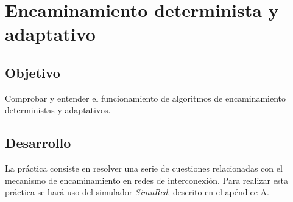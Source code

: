 \section{Encaminamiento determinista y adaptativo}\label{sec:p03intro}

\subsection{Objetivo}\label{ssec:p03objetivo}

\normalsize Comprobar y entender el funcionamiento de algoritmos de encaminamiento deterministas y
adaptativos.

\subsection{Desarrollo}\label{ssec:p03desarrollo}

\normalsize La práctica consiste en resolver una serie de  cuestiones relacionadas con el mecanismo de encaminamiento en redes de interconexión. Para realizar esta práctica se hará uso del simulador \emph{SimuRed}, descrito en el apéndice A.

